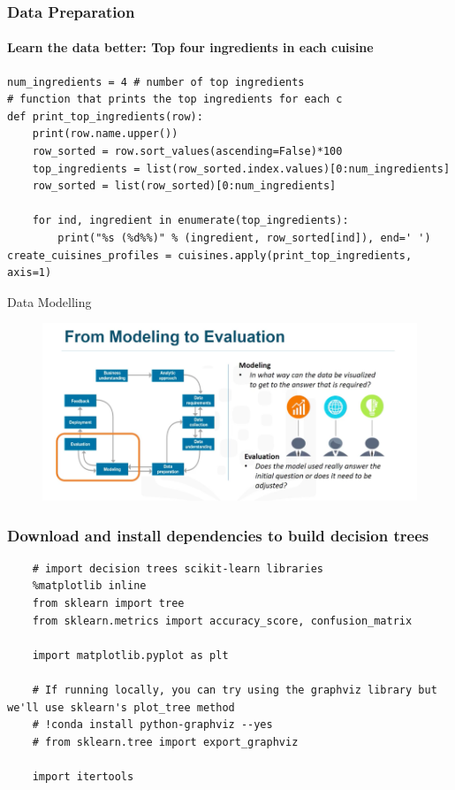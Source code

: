 \documentclass{beamer}
\begin{document}
\begin{frame}[fragile]
	\frametitle{Data Preparation}
	\framesubtitle{Learn the data better: Top four ingredients in each cuisine}
		\begin{lstlisting}
num_ingredients = 4 # number of top ingredients
# function that prints the top ingredients for each c
def print_top_ingredients(row):
	print(row.name.upper())
	row_sorted = row.sort_values(ascending=False)*100
	top_ingredients = list(row_sorted.index.values)[0:num_ingredients]
	row_sorted = list(row_sorted)[0:num_ingredients]

	for ind, ingredient in enumerate(top_ingredients):
		print("%s (%d%%)" % (ingredient, row_sorted[ind]), end=' ')
create_cuisines_profiles = cuisines.apply(print_top_ingredients, axis=1)
		\end{lstlisting}	
\end{frame}




\begin{frame}{Data Modelling}
	\begin{figure}
		\includegraphics[width=\textwidth]{Modelling.png}
	\end{figure}
\end{frame}


\begin{frame}[fragile]
	\frametitle{Download and install dependencies to build decision trees}
\begin{lstlisting}
	# import decision trees scikit-learn libraries
	%matplotlib inline
	from sklearn import tree
	from sklearn.metrics import accuracy_score, confusion_matrix
	
	import matplotlib.pyplot as plt
	
	# If running locally, you can try using the graphviz library but we'll use sklearn's plot_tree method
	# !conda install python-graphviz --yes
	# from sklearn.tree import export_graphviz
	
	import itertools
\end{lstlisting}
\end{frame}
\end{document}

